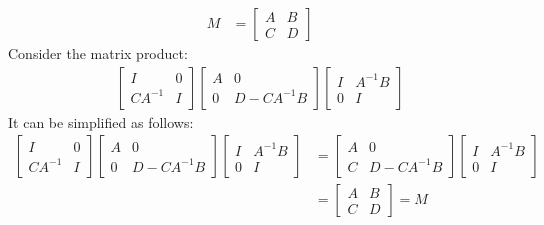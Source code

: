 \documentclass{article}
\begin{document}
\problem{}
\begin{align*}
    M & = \begin{bmatrix}
        A & B \\ C & D
    \end{bmatrix}
\end{align*}
Consider the matrix product:
\begin{align*}
    \begin{bmatrix}
        I & 0 \\ CA^{-1} & I
    \end{bmatrix}
    \begin{bmatrix}
        A & 0 \\ 0 & D - CA^{-1}B
    \end{bmatrix}
    \begin{bmatrix}
        I & A^{-1}B \\ 0 & I
    \end{bmatrix}
\end{align*}
It can be simplified as follows:
\begin{align*}
    \begin{bmatrix}
        I & 0 \\ CA^{-1} & I
    \end{bmatrix}
    \begin{bmatrix}
        A & 0 \\ 0 & D - CA^{-1}B
    \end{bmatrix}
    \begin{bmatrix}
        I & A^{-1}B \\ 0 & I
    \end{bmatrix} & = \begin{bmatrix}
        A & 0 \\ C & D - CA^{-1}B
    \end{bmatrix}
    \begin{bmatrix}
        I & A^{-1}B \\ 0 & I
    \end{bmatrix} \\
    & = \begin{bmatrix}
        A & B \\ C & D
    \end{bmatrix} = M
\end{align*}
\end{document}
